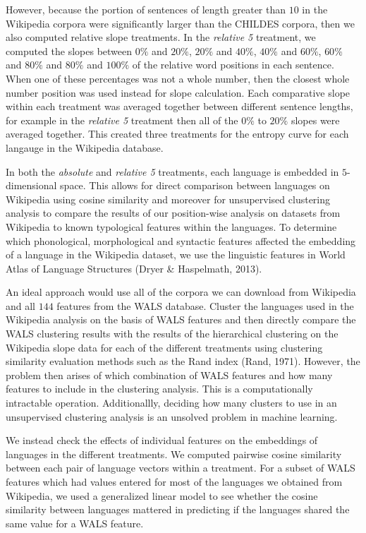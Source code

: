 \documentclass[10pt, letterpaper]{article}
\begin{document}
However, because the portion of sentences of length greater than \(10\)
in the Wikipedia corpora were significantly larger than the CHILDES
corpora, then we also computed relative slope treatments. In the
\emph{relative 5} treatment, we computed the slopes between \(0\%\) and
\(20\%\), \(20\%\) and \(40\%\), \(40\%\) and \(60\%\), \(60\%\) and
\(80\%\) and \(80\%\) and \(100\%\) of the relative word positions in
each sentence. When one of these percentages was not a whole number,
then the closest whole number position was used instead for slope
calculation. Each comparative slope within each treatment was averaged
together between different sentence lengths, for example in the
\emph{relative 5} treatment then all of the \(0\%\) to \(20\%\) slopes
were averaged together. This created three treatments for the entropy
curve for each langauge in the Wikipedia database.

In both the \emph{absolute} and \emph{relative 5} treatments, each
language is embedded in \(5\)-dimensional space. This allows for direct
comparison between languages on Wikipedia using cosine similarity and
moreover for unsupervised clustering analysis to compare the results of
our position-wise analysis on datasets from Wikipedia to known
typological features within the languages. To determine which
phonological, morphological and syntactic features affected the
embedding of a language in the Wikipedia dataset, we use the linguistic
features in World Atlas of Language Structures (Dryer \& Haspelmath,
2013).

An ideal approach would use all of the corpora we can download from
Wikipedia and all \(144\) features from the WALS database. Cluster the
languages used in the Wikipedia analysis on the basis of WALS features
and then directly compare the WALS clustering results with the results
of the hierarchical clustering on the Wikipedia slope data for each of
the different treatments using clustering similarity evaluation methods
such as the Rand index (Rand, 1971). However, the problem then arises of
which combination of WALS features and how many features to include in
the clustering analysis. This is a computationally intractable
operation. Additionallly, deciding how many clusters to use in an
unsupervised clustering analysis is an unsolved problem in machine
learning.

We instead check the effects of individual features on the embeddings of
languages in the different treatments. We computed pairwise cosine
similarity between each pair of language vectors within a treatment. For
a subset of WALS features which had values entered for most of the
languages we obtained from Wikipedia, we used a generalized linear model
to see whether the cosine similarity between languages mattered in
predicting if the languages shared the same value for a WALS feature.
\end{document}
